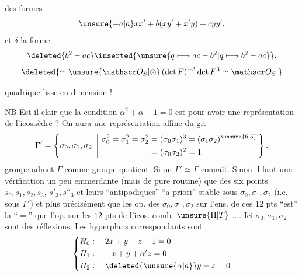 des formes
\[
\unsure{-a|a}xx'+b(xy'+x'y)+cyy',
\]
et $\delta$  la forme
\[
\deleted{b^2-ac}\inserted{\unsure{q\longmapsto ac-b^2|q\longmapsto b^2-ac}}.
\]
\[
\deleted{\simeq\unsure{\mathscr O_S|\otimes}\,(\det F)^{-3}\det F^3\simeq\mathscr O_S.}
\]


 \uline{quadrique lisse} en  dimension !


\uline{NB} Est-il clair que la condition $\alpha^2+\alpha-1=0$
est \uline{} pour avoir une représentation
de l'icosaèdre ? On aura une représentation affine du gr.
\[
\Gamma'=\left\{\sigma_0,\sigma_1,\sigma_2\ \left|\
\begin{aligned}
\sigma_0^2=\sigma_1^2=\sigma_2^2&=(\sigma_0\sigma_1)^3=(\sigma_1\sigma_2)^{\unsure{6|5}}\\
&=(\sigma_0\sigma_2)^2=1
\end{aligned}\right.\right\}.
\]
 groupe  admet $\Gamma$ comme
groupe quotient. Si on \deleted{\unsure{savait}}\inserted{utilise}
$\Gamma'\simeq\Gamma$ \unsure{---} \unsure{qu'on} connaît.
Sinon il faut une vérification un peu emmerdante
(mais de pure routine) que 
des six points $s_0,s_1,s_2,s_3$, $s'_3,s''_3$ et leurs
``antipodiques''  ``a priori''  stable sous
$\sigma_0,\sigma_1,\sigma_2$ (i.e. sous $\Gamma'$) et
 plus précisément que les op. des
$\sigma_0,\sigma_1,\sigma_2$ sur l'ens. de ces $12$ pts ``est'' la
``$=$'' que l'op. sur les $12$ pts de l'icos. comb. $\unsure{\Pi|T}$ ....
Ici $\sigma_0,\sigma_1,\sigma_2$ sont des réflexions. Les
hyperplans correspondants sont 
\[
\left\{\begin{aligned}
H_0&:\quad 2x+y+z-1=0\\
H_1&:\quad -x+y+\alpha'z=0\\
H_2&:\quad \deleted{\unsure{\alpha|a}}y-z=0
\end{aligned}\right.
\]


